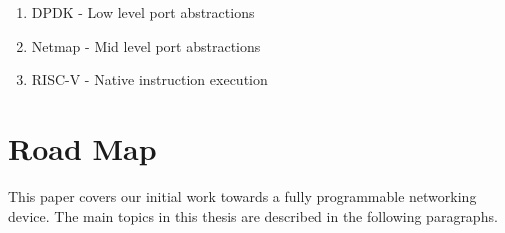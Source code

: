 \begin{enumerate}
  \item DPDK - Low level port abstractions
  \item Netmap - Mid level port abstractions
  \item RISC-V - Native instruction execution
\end{enumerate}

%
%

\section{Road Map}
\label{intro:map}
This paper covers our initial work towards a fully programmable networking
device. The main topics in this thesis are described in the following
paragraphs.

